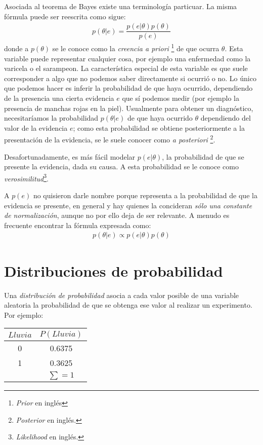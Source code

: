 Asociada al teorema de Bayes existe una terminología particuar.  La misma fórmula puede ser reescrita como sigue:
\begin{align}
 p(\theta | e ) = \dfrac{p(e | \theta) p(\theta)}{p(e)}
\end{align}
donde a $p(\theta)$ se le conoce como la \emph{creencia a priori} \footnote{\textit{Prior} en inglés} de que ocurra $\theta$.  Esta variable puede representar cualquier cosa, por ejemplo una enfermedad como la varicela o el sarampeon.  La característica especial de esta variable es que suele corresponder a algo que no podemos saber directamente si ocurrió o no.  Lo único que podemos hacer es inferir la probabilidad de que haya ocurrido, dependiendo de la presencia una cierta evidencia $e$ que sí podemos medir (por ejemplo la presencia de manchas rojas en la piel).  Usualmente para obtener un diagnóstico, necesitaríamos la probabilidad $p(\theta | e)$ de que haya ocurrido $\theta$ dependiendo del valor de la evidencia $e$; como esta probabilidad se obtiene posteriormente a la presentación de la evidencia, se le suele conocer como \emph{a posteriori} \footnote{\textit{Posterior} en inglés.}.

Desafortunadamente, es más fácil modelar $p(e | \theta)$, la probabilidad de que se presente la evidencia, dada su causa.  A esta probabilidad se le conoce como \emph{verosimilitud}\footnote{\textit{Likelihood} en inglés.}.

A $p(e)$ no quisieron darle nombre porque representa a la probabilidad de que la evidencia se presente, en general y hay quienes la concideran \textit{sólo una constante de normalización}, aunque no por ello deja de ser relevante.  A menudo es frecuente encontrar la fórmula expresada como:
\begin{align}
 p(\theta | e ) \propto p(e | \theta) p(\theta)
\end{align}



\section{Distribuciones de probabilidad}

Una \emph{distribución de probabilidad} asocia a cada valor posible de una variable aleatoria la probabilidad de que se obtenga ese valor al realizar un experimento.  Por ejemplo:

\begin{center}
\begin{tabular}{c|c}
 $Lluvia$ & $P(Lluvia)$ \\ \toprule
 0 & 0.6375 \\
 1 & 0.3625 \\
 \multicolumn{1}{c}{}  & $\sum=1$
\end{tabular}
\end{center}

